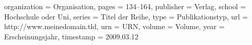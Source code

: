 {    organization = {Organisation},               %
    pages = {134--164},                          %
    publisher = {Verlag},                        %
    school = {Hochschule oder Uni},              %
    series = {Titel der Reihe},                  %
    type = {Publikationstyp},                    %
    url = {http://www.meinedomain.tld},          %
    urn = {URN},                                 %
    volume = {Volume},                           %
    year = {Erscheinungsjahr},                   %
  timestamp = {2009.03.12}
}
